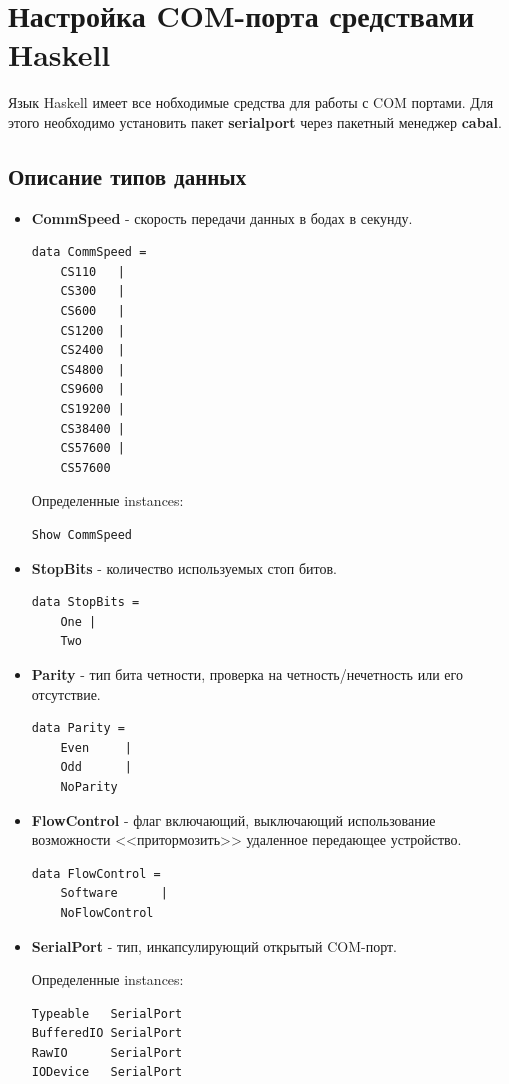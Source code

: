 \documentclass[russian,utf8,simple,emptystyle]{eskdtext}
\begin{document}
\section{Настройка COM-порта средствами Haskell}
Язык Haskell имеет все нобходимые средства для работы с COM портами. Для этого необходимо установить пакет \textbf{serialport } через пакетный менеджер \textbf{cabal}. 

\subsection{Описание типов данных}
\begin{itemize}
\item \textbf{CommSpeed} - скорость передачи данных в бодах в секунду.
\begin{lstlisting}
data CommSpeed =
	CS110   |
	CS300   |
	CS600   |
	CS1200  |
	CS2400  |
	CS4800  |
	CS9600  |
	CS19200 |
	CS38400 |
	CS57600 |
	CS57600 
\end{lstlisting}
Определенные instances:
\begin{lstlisting}
Show CommSpeed
\end{lstlisting}

\item \textbf{StopBits} - количество используемых стоп битов.
\begin{lstlisting}
data StopBits =
	One |
	Two
\end{lstlisting}

\item \textbf{Parity} - тип бита четности, проверка на четность/нечетность или его отсутствие.
\begin{lstlisting}
data Parity =
	Even     |
	Odd      |
	NoParity
\end{lstlisting}

\item \textbf{FlowControl} - флаг включающий, выключающий использование возможности <<притормозить>> удаленное передающее устройство.

\begin{lstlisting}
data FlowControl =
	Software      |
	NoFlowControl
\end{lstlisting}

\item \textbf{SerialPort} - тип, инкапсулирующий открытый COM-порт.

Определенные instances:
\begin{lstlisting}
Typeable   SerialPort	 
BufferedIO SerialPort	 
RawIO      SerialPort	 
IODevice   SerialPort	
\end{lstlisting}


\end{itemize}
\end{document}
